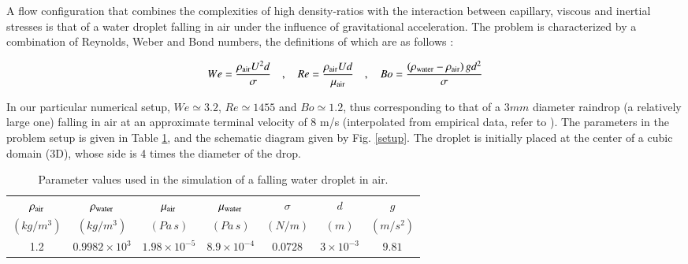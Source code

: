
A flow configuration that combines the complexities of high density-ratios with the interaction between capillary, viscous and inertial stresses is that of a water droplet falling in air under the influence of gravitational acceleration. The problem is characterized by a combination of Reynolds, Weber and Bond numbers, the definitions of which are as follows : 

\begin{align}
We=\frac{\rho_{\rm air} U^2 d}{\sigma} \quad,\quad Re= \frac{\rho_{\rm air} U d}{\mu_{\rm air}} \quad,\quad Bo=\frac{\left(\rho_{\rm water}-\rho_{\rm air}\right) g d^2 }{\sigma}
\end{align}

\vspace*{0.2cm}

In our particular numerical setup, $We \simeq 3.2 $, $Re \simeq 1455 $ and $Bo \simeq 1.2 $, thus corresponding to that of a $3mm$ diameter raindrop (a relatively large one) falling in air at an approximate terminal velocity of  $8$ m/s (interpolated from empirical data, refer to  \cite{gunn1949terminal}). The parameters in the problem setup is given in Table \ref{raindropprop}, and the schematic diagram given by Fig. \ref{setup}. The droplet is initially placed at the center of a cubic domain (3D), whose side is 4 times the diameter of the drop. 

\vspace*{0.2cm}

\begin{table}[h!]
\begin{center}
\begin{tabular}{ccccccc}
\hline\hline
$\rho_{\rm air}$ & $\rho_{\rm water}$ & $\mu_{\rm air}$ 
& $\mu_{\rm water}$ & $\sigma$ & $d$ & $g$\\
$\left(kg/m^3\right)$ & $\left(kg/m^3\right)$ & $\left(Pa \, s\right)$ 
& $\left(Pa \,s \right)$ & $\left(N/m\right)$ & $(m)$ & $(m /s^{2})$ \\
\hline
1.2 & $0.9982 \times 10^3$ & $1.98 \times 10^{-5}$ & 
$8.9 \times 10^{-4}$ & $0.0728$ & $3 \times 10^{-3}$ & $9.81$\\
\hline\hline
\end{tabular}
\caption{Parameter values used in the simulation of a falling water droplet in air. \label{raindropprop}}
\end{center}
\end{table}

\vspace*{0.2cm}

